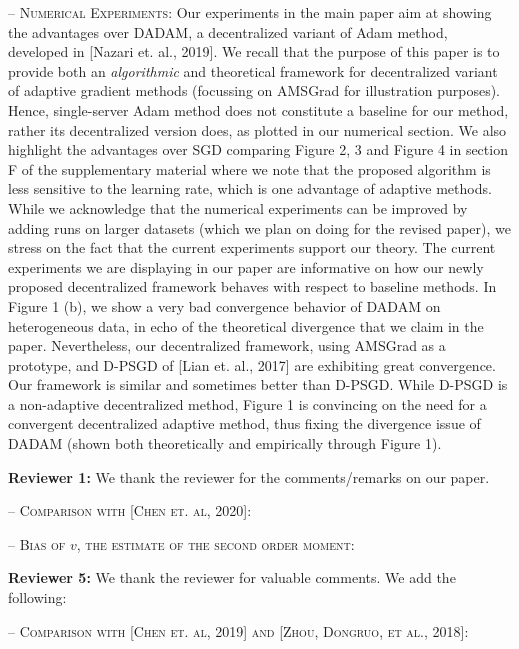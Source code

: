 \documentclass{article} %
\begin{document}
 \textsc{-- Numerical Experiments:} 
Our experiments in the main paper aim at showing the advantages over DADAM, a decentralized variant of Adam method, developed in [Nazari et. al., 2019].
We recall that the purpose of this paper is to provide both an \emph{algorithmic} and {theoretical} framework for decentralized variant of adaptive gradient methods (focussing on AMSGrad for illustration purposes). 
Hence, single-server Adam method does not constitute a baseline for our method, rather its decentralized version does, as plotted in our numerical section.
We also highlight the advantages over SGD comparing Figure 2, 3 and Figure 4 in section F of the supplementary material where we note that the proposed algorithm is less sensitive to the learning rate, which is one advantage of adaptive methods.
While we acknowledge that the numerical experiments can be improved by adding runs on larger datasets (which we plan on doing for the revised paper), we stress on the fact that the current experiments support our theory. 
The current experiments we are displaying in our paper are informative on how our newly proposed decentralized framework behaves with respect to baseline methods. In Figure 1 (b), we show a very bad convergence behavior of DADAM on heterogeneous data, in echo of the theoretical divergence that we claim in the paper. 
Nevertheless, our decentralized framework, using AMSGrad as a prototype, and D-PSGD of [Lian et. al., 2017] are exhibiting great convergence. 
Our framework is similar and sometimes better than D-PSGD. While D-PSGD is a non-adaptive decentralized method, Figure 1 is convincing on the need for a convergent decentralized adaptive method, thus fixing the divergence issue of DADAM (shown both theoretically and empirically through Figure 1).

\textbf{Reviewer 1:}
We thank the reviewer for the comments/remarks on our paper. \vspace{-4pt}

\textsc{-- Comparison with [Chen et. al, 2020]:}

 \vspace{-2pt}
\textsc{-- Bias of $v$, the estimate of the second order moment:}


\textbf{Reviewer 5:}
We thank the reviewer for valuable comments. We add the following: \vspace{-4pt}




\textsc{-- Comparison with [Chen et. al, 2019] and [Zhou, Dongruo, et al., 2018]:}
\end{document}
